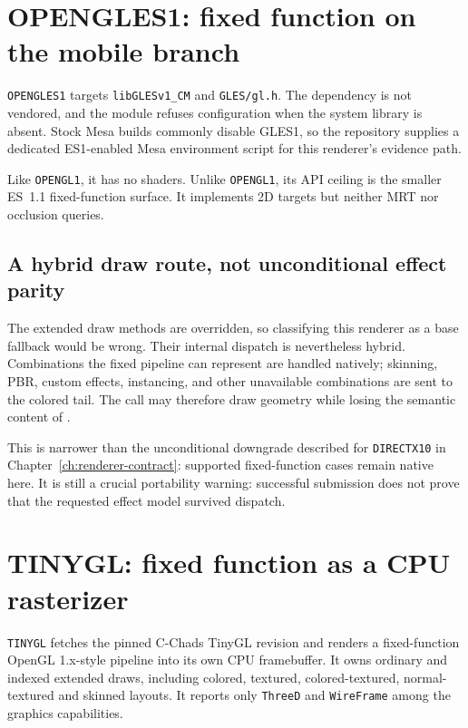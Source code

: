 \section{OPENGLES1: fixed function on the mobile branch}

\texttt{OPENGLES1} targets \texttt{libGLESv1\_CM} and \texttt{GLES/gl.h}.  The dependency is
not vendored, and the module refuses configuration when the system library is absent.  Stock
Mesa builds commonly disable GLES1, so the repository supplies a dedicated ES1-enabled Mesa
environment script for this renderer's evidence path.

Like \texttt{OPENGL1}, it has no shaders.  Unlike \texttt{OPENGL1}, its API ceiling is the
smaller ES~1.1 fixed-function surface.  It implements 2D targets but neither MRT nor occlusion
queries.

\subsection{A hybrid draw route, not unconditional effect parity}

The extended draw methods are overridden, so classifying this renderer as a base fallback
would be wrong.  Their internal dispatch is nevertheless hybrid.  Combinations the fixed
pipeline can represent are handled natively; skinning, PBR, custom effects, instancing, and
other unavailable combinations are sent to the colored tail.  The call may therefore draw
geometry while losing the semantic content of .

This is narrower than the unconditional downgrade described for \texttt{DIRECTX10} in
Chapter~\ref{ch:renderer-contract}: supported fixed-function cases remain native here.  It is
still a crucial portability warning: successful submission does not prove that the requested
effect model survived dispatch.

\section{TINYGL: fixed function as a CPU rasterizer}

\texttt{TINYGL} fetches the pinned C-Chads TinyGL revision and renders a fixed-function OpenGL
1.x-style pipeline into its own CPU framebuffer. It owns ordinary and indexed extended draws,
including colored, textured, colored-textured, normal-textured and skinned layouts. It reports
only \texttt{ThreeD} and \texttt{WireFrame} among the graphics capabilities.

